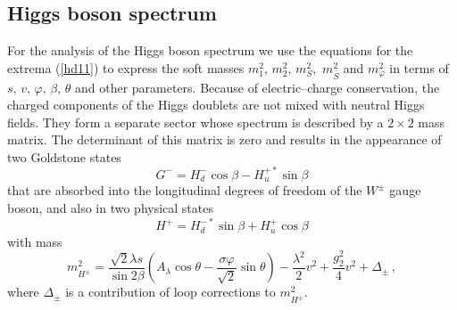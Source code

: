 \documentclass[12pt,a4paper]{article}
\newcommand{\be}{\begin{equation}}
\newcommand{\ee}{\end{equation}}
\begin{document}
\subsection{Higgs boson spectrum}

For the analysis of the Higgs boson spectrum we use the equations for the extrema (\ref{hd11}) to express the soft masses
$m_1^2,\,m_2^2,\,m_{S}^2$,\, $m_{\overline{S}}^2$ and $m^2_{\varphi}$ in terms of $s,\,v,\,\varphi,\, \beta,\, \theta$
and other parameters. Because of electric--charge conservation, the charged components of the Higgs doublets are not
mixed with neutral Higgs fields. They form a separate sector whose spectrum is described by a $2\times 2$ mass matrix.
The determinant of this matrix is zero and results in the appearance of two Goldstone states
\be
G^{-}=H_d^{-}\cos\beta-H_u^{+*}\sin\beta
\label{hd13}
\ee
that are absorbed into the longitudinal degrees of freedom of the $W^{\pm}$ gauge boson, and also in two physical states
\be
H^{+}=H_d^{-*}\sin\beta+H_u^{+}\cos\beta
\label{hd14}
\ee
with mass
\be
m^2_{H^{\pm}}=\dfrac{\sqrt{2}\lambda s}{\sin 2\beta}\left(A_{\lambda} \cos\theta - \dfrac{\sigma \varphi}{\sqrt{2}}\sin\theta\right)
-\frac{\lambda^2}{2}v^2+\frac{g_2^2}{4}v^2+\Delta_{\pm}\,,
\label{hd15}
\ee
where $\Delta_{\pm}$ is a contribution of loop corrections to $m^2_{H^{\pm}}$.
\end{document}
